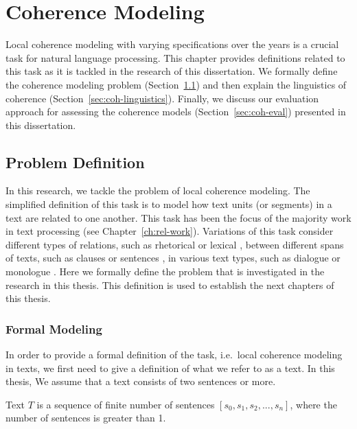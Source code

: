 
\chapter{Coherence Modeling}
\label{ch:coherence}

Local coherence modeling with varying specifications over the years is a crucial task for natural language processing. 
This chapter provides definitions related to this task as it is tackled in the research of this dissertation. 
We formally define the coherence modeling problem (Section~\ref{sec:coh-def}) and then explain the linguistics of coherence (Section~\ref{sec:coh-linguistics}). 
Finally, we discuss our evaluation approach for assessing the coherence models (Section~\ref{sec:coh-eval}) presented in this dissertation.   


\section{Problem Definition}
\label{sec:coh-def}

In this research, we tackle the problem of local coherence modeling. 
The simplified definition of this task is to model how text units (or segments) in a text are related to one another. 
This task has been the focus of the majority work in text processing (see Chapter~\ref{ch:rel-work}). 
Variations of this task consider different types of relations, such as rhetorical \cite{hovyeduard89} or lexical \cite{morris91}, between different spans of texts, such as clauses \cite{strube.col98} or sentences \cite{halliday76}, in various text types, such as dialogue \cite{wangxinhao13} or monologue \cite{barzilay08}. 
Here we formally define the problem that is investigated in the research in this thesis.  
This definition is used to establish the next chapters of this thesis. 

\subsection{Formal Modeling}

In order to provide a formal definition of the task, i.e.\ local coherence modeling in texts, we first need to give a definition of what we refer to as a text. 
In this thesis, 
We assume that a text consists of two sentences or more.  

\begin{definition}
Text $T$ is a sequence of finite number of sentences $[s_0, s_1, s_2, ..., s_n]$, where the number of sentences is greater than 1.   
\end{definition}

